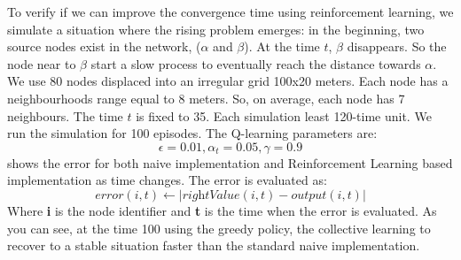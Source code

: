 \documentclass[
  twocolumn,
]{ceurart}
\begin{document}
To verify if we can improve the convergence time using reinforcement learning,
 we simulate a situation where the rising problem emerges:
 in the beginning, two source nodes exist in the network, ($\alpha$ and $\beta$).
 At the time $t$, $\beta$ disappears. So the node near to $\beta$ start a slow process
 to eventually reach the distance towards $\alpha$.
%
We use 80 nodes displaced into an irregular grid 100x20 meters. 
 Each node has a neighbourhoods range equal to 8 meters. 
 So, on average, each node has 7 neighbours.
 The time $t$ is fixed to 35.
 Each simulation least 120-time unit.
% 
We run the simulation for 100 episodes.
 The Q-learning parameters are:
$$
\epsilon = 0.01, 
\alpha_t = 0.05,
\gamma = 0.9
$$
 shows the error for both naive implementation and Reinforcement Learning based implementation as time changes.
The error is evaluated as:
$$
error(i, t) \leftarrow  | \textit{rightValue}(i,t) - \textit{output}(i,t) |
$$
Where \textbf{i} is the node identifier and \textbf{t} is the time when the error is evaluated.
%
As you can see, at the time 100 using the greedy policy, the collective learning to recover to a stable situation
 faster than the standard naive implementation.
\end{document}
